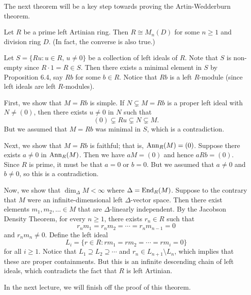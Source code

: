 The next theorem will be a key step towards proving the Artin-Wedderburn theorem.

\begin{thm}
Let $R$ be a prime left Artinian ring. Then $R \cong M_n(D)$ for some $n \geq 1$ and division ring 
$D$. (In fact, the converse is also true.)
\end{thm}
\begin{pf}
Let $S = \{Ru : u \in R,\, u \neq 0\}$ be a collection of left ideals of $R$. Note that $S$ 
is non-empty since $R \cdot 1 = R \in S$. Then there exists a minimal element in $S$ by Proposition 
6.4, say $Rb$ for some $b \in R$. Notice that $Rb$ is a left $R$-module (since 
left ideals are left $R$-modules). 

First, we show that $M = Rb$ is simple. If $N \subsetneq M = Rb$ is a proper left ideal with 
$N \neq (0)$, then there exists $u \neq 0$ in $N$ such that 
\[ (0) \subsetneq Ru \subsetneq N \subsetneq M. \]
But we assumed that $M = Rb$ was minimal in $S$, which is a contradiction. 

Next, we show that $M = Rb$ is faithful; that is, $\operatorname{Ann}_R(M) = (0)$. Suppose there exists 
$a \neq 0$ in $\operatorname{Ann}_R(M)$. Then we have $aM = (0)$ and hence $aRb = (0)$. Since $R$ is prime,
it must be that $a = 0$ or $b = 0$. But we assumed that $a \neq 0$ and $b \neq 0$, so this is 
a contradiction. 

Now, we show that $\dim_\Delta M < \infty$ where $\Delta = \operatorname{End}_R(M)$. Suppose to the contrary 
that $M$ were an infinite-dimensional left $\Delta$-vector space. Then there exist elements 
$m_1, m_2, \dots \in M$ that are $\Delta$-linearly independent. By the Jacobson Density Theorem, 
for every $n \geq 1$, there exists $r_n \in R$ such that 
\[ r_nm_1 = r_nm_2 = \cdots = r_nm_{n-1} = 0 \]
and $r_nm_n \neq 0$. Define the left ideal 
\[ L_i = \{r \in R : rm_1 = rm_2 = \cdots = rm_i = 0\} \]
for all $i \geq 1$. Notice that $L_1 \supseteq L_2 \supseteq \cdots$ and $r_n \in L_{n+1} \setminus L_n$,
which implies that these are proper containments. But this is an infinite descending chain of 
left ideals, which contradicts the fact that $R$ is left Artinian. 

In the next lecture, we will finish off the proof of this theorem.
\end{pf}